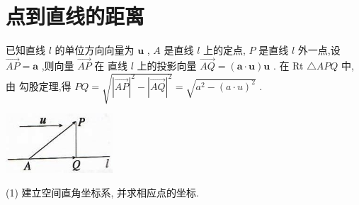 \documentclass[10pt,cn]{elegantbook}
\begin{document}
\begin{center}
\end{center}

\section{点到直线的距离}

已知直线 \(l\) 的单位方向向量为 \(\mathbf{u}\) ,
\(A\) 是直线 \(l\) 上的定点, \(P\) 是直线 \(l\)
外一点,设 \(\overrightarrow{AP} = \mathbf{a}\) ,则向量 \(\overrightarrow{AP}\) 在
直线 \(l\) 上的投影向量 \(\overrightarrow{AQ} = \left( {\mathbf{a} \cdot \mathbf{u}}\right) \mathbf{u}\) . 在 Rt \(\bigtriangleup {APQ}\) 中,由
勾股定理,得 \({PQ} = \sqrt{{\left| \overrightarrow{AP}\right| }^{2} - {\left| \overrightarrow{AQ}\right| }^{2}} = \sqrt{{a}^{2} - {\left( a \cdot u\right) }^{2}}\) .

\begin{center}
	\includegraphics[max width=0.3\textwidth]{images/019111e7-c8b0-74a7-8b9e-0df758ddb65d_0_169880.jpg}
\end{center}



(1) 建立空间直角坐标系, 并求相应点的坐标.
\end{document}
